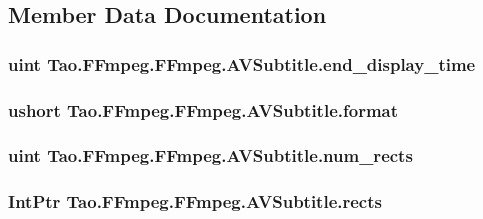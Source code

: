 \subsection{Member Data Documentation}
\hypertarget{struct_tao_1_1_f_fmpeg_1_1_f_fmpeg_1_1_a_v_subtitle_a1537cda71104c7de887f7e0456a728b0}{
\subsubsection[{end\_\-display\_\-time}]{\setlength{\rightskip}{0pt plus 5cm}uint {\bf Tao.FFmpeg.FFmpeg.AVSubtitle.end\_\-display\_\-time}}}
\label{struct_tao_1_1_f_fmpeg_1_1_f_fmpeg_1_1_a_v_subtitle_a1537cda71104c7de887f7e0456a728b0}
\hypertarget{struct_tao_1_1_f_fmpeg_1_1_f_fmpeg_1_1_a_v_subtitle_acb7425663bffcfd668bd7c6226381648}{
\subsubsection[{format}]{\setlength{\rightskip}{0pt plus 5cm}ushort {\bf Tao.FFmpeg.FFmpeg.AVSubtitle.format}}}
\label{struct_tao_1_1_f_fmpeg_1_1_f_fmpeg_1_1_a_v_subtitle_acb7425663bffcfd668bd7c6226381648}
\hypertarget{struct_tao_1_1_f_fmpeg_1_1_f_fmpeg_1_1_a_v_subtitle_ae5c414ffe18cfe6966ec1fabba2d084f}{
\subsubsection[{num\_\-rects}]{\setlength{\rightskip}{0pt plus 5cm}uint {\bf Tao.FFmpeg.FFmpeg.AVSubtitle.num\_\-rects}}}
\label{struct_tao_1_1_f_fmpeg_1_1_f_fmpeg_1_1_a_v_subtitle_ae5c414ffe18cfe6966ec1fabba2d084f}
\hypertarget{struct_tao_1_1_f_fmpeg_1_1_f_fmpeg_1_1_a_v_subtitle_a721024059823d4985263f2e7aaa29d68}{
\subsubsection[{rects}]{\setlength{\rightskip}{0pt plus 5cm}IntPtr {\bf Tao.FFmpeg.FFmpeg.AVSubtitle.rects}}}
